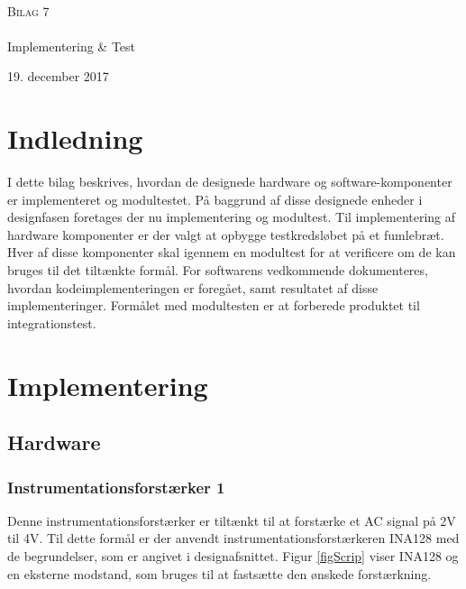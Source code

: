 

\begin{titlingpage}
\begin{center}

~ \\[3cm]


\textsc{\LARGE Bilag 7	}\\[1.5cm]


\noindent\makebox[\linewidth]{\rule{\textwidth}{0.4pt}}\\
[0.5cm]{\Huge Implementering \& Test}
\noindent\makebox[\linewidth]{\rule{\textwidth}{0.4pt}}
\end{center}
\vfill
\begin{center}
{\large 19. december 2017}
\end{center}
\end{titlingpage}

\newpage
\tableofcontents*
\newpage

\chapter{Indledning}
I dette bilag beskrives, hvordan de designede hardware og software-komponenter er implementeret og modultestet. På baggrund af disse designede enheder i designfasen foretages der nu implementering og modultest. Til implementering af hardware komponenter er der valgt at opbygge testkredsløbet på et fumlebræt. Hver af disse komponenter skal igennem en modultest for at verificere om de kan bruges til det tiltænkte formål. For softwarens vedkommende dokumenteres, hvordan kodeimplementeringen er foregået, samt resultatet af disse implementeringer. Formålet med modultesten er at forberede produktet til integrationstest.       
\chapter{Implementering}
\section{Hardware}
\subsection{Instrumentationsforstærker 1}
Denne instrumentationsforstærker er tiltænkt til at forstærke et AC signal på 2V til 4V. Til dette formål  er der anvendt instrumentationsforstærkeren INA128 med de begrundelser, som er angivet i designafsnittet. Figur \ref{figScrip} viser INA128 og en eksterne modstand, som bruges til at fastsætte den ønskede forstærkning.  


